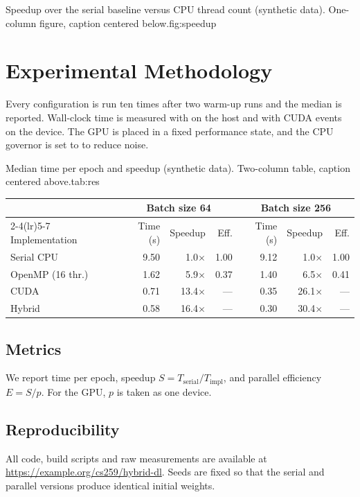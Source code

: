 \documentclass[siunitx]{cs259}
\begin{document}
%
  {Speedup over the serial baseline versus CPU thread count (synthetic data).
   One-column figure, caption centered below.}{fig:speedup}

\section{Experimental Methodology}\label{sec:method}
Every configuration is run ten times after two warm-up runs and the median is
reported. Wall-clock time is measured with  on the host
and with CUDA events on the device. The GPU is placed in a fixed performance
state, and the CPU governor is set to  to reduce noise.

\begin{widetable}{Median time per epoch and speedup (synthetic data).
  Two-column table, caption centered above.}{tab:res}
\begin{tabular*}{\textwidth}{@{\extracolsep{\fill}}lrrrrrr@{}}
\toprule
 & \multicolumn{3}{c}{Batch size 64} & \multicolumn{3}{c}{Batch size 256} \\
\cmidrule(lr){2-4}\cmidrule(lr){5-7}
Implementation & Time (s) & Speedup & Eff. & Time (s) & Speedup & Eff. \\
\midrule
Serial CPU      & 9.50 & 1.0$\times$  & 1.00 & 9.12 & 1.0$\times$  & 1.00 \\
OpenMP (16 thr.)& 1.62 & 5.9$\times$  & 0.37 & 1.40 & 6.5$\times$  & 0.41 \\
CUDA            & 0.71 & 13.4$\times$ & ---  & 0.35 & 26.1$\times$ & ---  \\
Hybrid          & 0.58 & 16.4$\times$ & ---  & 0.30 & 30.4$\times$ & ---  \\
\bottomrule
\end{tabular*}
\end{widetable}

\subsection{Metrics}
We report time per epoch, speedup $S=T_{\mathrm{serial}}/T_{\mathrm{impl}}$,
and parallel efficiency $E=S/p$. For the GPU, $p$ is taken as one device.

\subsection{Reproducibility}
All code, build scripts and raw measurements are available at
\url{https://example.org/cs259/hybrid-dl}. Seeds are fixed so that the
serial and parallel versions produce identical initial weights.
\end{document}
